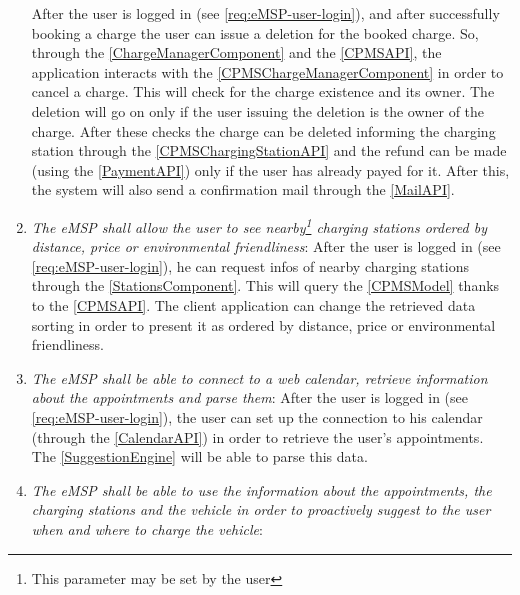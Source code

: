 \begin{enumerate}[label=\textbf{R\arabic*}]
            After the user is logged in (see \ref{req:eMSP-user-login}), and after successfully booking a charge the user can issue a deletion for the booked charge.
            So, through the \ref{ChargeManagerComponent} and the \ref{CPMSAPI}, the application interacts with the \ref{CPMSChargeManagerComponent} in order to cancel a charge. This will check for the charge existence and its owner. The deletion will go on only if the user issuing the deletion is the owner of the charge.
            After these checks the charge can be deleted informing the charging station through the \ref{CPMSChargingStationAPI} and the refund can be made (using the \ref{PaymentAPI}) only if the user has already payed for it.
            After this, the system will also send a confirmation mail through the \ref{MailAPI}.
            \label{req:eMSP-refund}
      \item \textit{The \ac{eMSP} shall allow the user to see nearby\footnote{This parameter may be set by the user} charging stations ordered by distance, price or environmental friendliness}:
            After the user is logged in (see \ref{req:eMSP-user-login}), he can request infos of nearby charging stations through the \ref{StationsComponent}. This will query the \ref{CPMSModel} thanks to the \ref{CPMSAPI}. The client application can change the retrieved data sorting in order to present it as ordered by distance, price or environmental friendliness.
            \label{req:eMSP-see-stations}
      \item \textit{The \ac{eMSP} shall be able to connect to a web calendar, retrieve information about the appointments and parse them}:
            After the user is logged in (see \ref{req:eMSP-user-login}), the user can set up the connection to his calendar (through the \ref{CalendarAPI}) in order to retrieve the user's appointments. The \ref{SuggestionEngine} will be able to parse this data.
            \label{req:eMSP-connect-calendar}
      \item \textit{The \ac{eMSP} shall be able to use the information about the appointments, the charging stations and the vehicle in order to proactively suggest to the user when and where to charge the vehicle}:

\end{enumerate}
